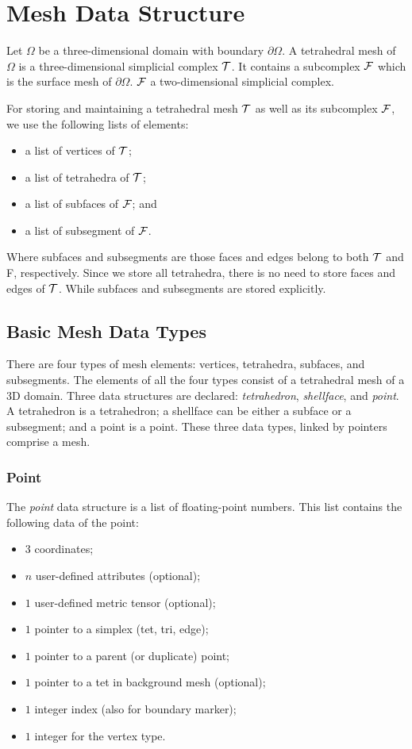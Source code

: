 \chapter{Mesh Data Structure}
\label{chap:meshds}

Let $\Omega$ be a three-dimensional domain with boundary $\partial\Omega$. A tetrahedral mesh of $\Omega$ is a three-dimensional simplicial complex ${\cal T}$. It contains a subcomplex ${\cal F}$ which is the surface mesh of $\partial\Omega$. ${\cal F}$ a two-dimensional simplicial complex.

For storing and maintaining a tetrahedral mesh ${\cal T}$ as well as its subcomplex ${\cal F}$, we use the following lists of elements:
\begin{itemize}
\item a list of vertices of ${\cal T}$;
\item a list of tetrahedra of ${\cal T}$;
\item a list of subfaces of ${\cal F}$; and
\item a list of subsegment of ${\cal F}$.
\end{itemize}
Where subfaces and subsegments are those faces and edges belong to both ${\cal T}$ and {\cal F}, respectively. Since we store all tetrahedra, there is no need to store faces and edges of ${\cal T}$. While subfaces and subsegments are stored explicitly. 

\section{Basic Mesh Data Types}

There are four types of mesh elements: vertices, tetrahedra, subfaces, and subsegments. The elements of all the four types consist of a tetrahedral mesh of a 3D domain.  Three data structures are declared:  {\it tetrahedron}, {\it shellface}, and {\it point}. A tetrahedron is a tetrahedron;  a shellface can be either a subface or a subsegment;  and a point is a point. These three data types, linked by pointers comprise a mesh.

\subsection{Point}

The {\it point} data structure is a list of floating-point numbers. This list contains the following data of the point:
\begin{itemize}
\item $3$ coordinates;
\item $n$ user-defined attributes (optional);
\item $1$ user-defined metric tensor (optional);
\item $1$ pointer to a simplex (tet, tri, edge); 
\item $1$ pointer to a parent (or duplicate) point;
\item $1$ pointer to a tet in background mesh (optional);
\item $1$ integer index (also for boundary marker);
\item $1$ integer for the vertex type.
\end{itemize}

